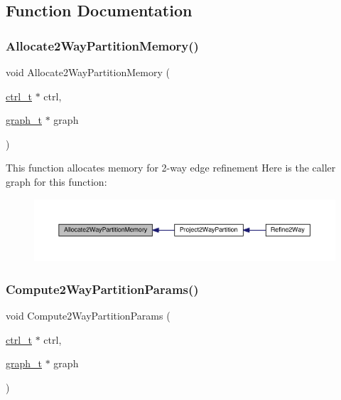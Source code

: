 \subsection{Function Documentation}
\mbox{\label{a00266_aadcb666600c1f5ded03cdd998b6ffd8f}} 
\subsubsection{\texorpdfstring{Allocate2\+Way\+Partition\+Memory()}{Allocate2WayPartitionMemory()}}
{\footnotesize\ttfamily void Allocate2\+Way\+Partition\+Memory (\begin{DoxyParamCaption}\item[{\hyperlink{a00742}{ctrl\+\_\+t} $\ast$}]{ctrl,  }\item[{\hyperlink{a00734}{graph\+\_\+t} $\ast$}]{graph }\end{DoxyParamCaption})}

This function allocates memory for 2-\/way edge refinement Here is the caller graph for this function\+:\nopagebreak
\begin{figure}[H]
\begin{center}
\leavevmode
\includegraphics[width=350pt]{a00266_aadcb666600c1f5ded03cdd998b6ffd8f_icgraph}
\end{center}
\end{figure}
\mbox{\label{a00266_a0ed9efb4761e829a24f4066856640f86}} 
\subsubsection{\texorpdfstring{Compute2\+Way\+Partition\+Params()}{Compute2WayPartitionParams()}}
{\footnotesize\ttfamily void Compute2\+Way\+Partition\+Params (\begin{DoxyParamCaption}\item[{\hyperlink{a00742}{ctrl\+\_\+t} $\ast$}]{ctrl,  }\item[{\hyperlink{a00734}{graph\+\_\+t} $\ast$}]{graph }\end{DoxyParamCaption})}

